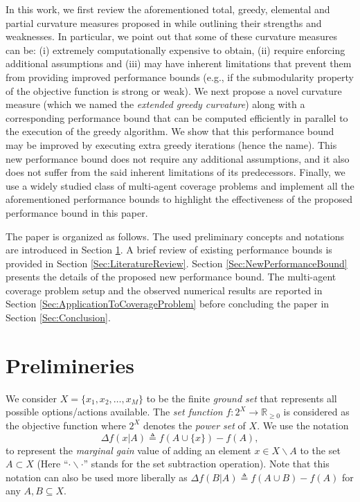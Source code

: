 \documentclass[conference]{IEEEtran}
\newcommand{\R}{\mathbb{R}}
\begin{document}
In this work, we first review the aforementioned total, greedy, elemental and partial curvature measures proposed in \cite{Conforti1984,Wang2016,Liu2018} while outlining their strengths and weaknesses. In particular, we point out that some of these curvature measures can be: (i) extremely computationally expensive to obtain, (ii) require enforcing additional assumptions and (iii) may have inherent limitations that prevent them from providing improved performance bounds (e.g., if the submodularity property of the objective function is strong or weak). We next propose a novel curvature measure (which we named the \emph{extended greedy curvature}) along with a corresponding performance bound that can be computed efficiently in parallel to the execution of the greedy algorithm. We show that this performance bound may be improved by executing extra greedy iterations (hence the name). This new performance bound does not require any additional assumptions, and it also does not suffer from the said inherent limitations of its predecessors. Finally, we use a widely studied class of multi-agent coverage problems \cite{Sun2019,Sun2020} and implement all the aforementioned performance bounds to highlight the effectiveness of the proposed performance bound in this paper.  







The paper is organized as follows. The used preliminary concepts and notations are introduced in Section \ref{Sec:PreliminariesAndNotation}. A brief review of existing performance bounds is provided in Section \ref{Sec:LiteratureReview}. Section \ref{Sec:NewPerformanceBound} presents the details of the proposed new performance bound. The multi-agent coverage problem setup and the observed numerical results are reported in Section \ref{Sec:ApplicationToCoverageProblem} before concluding the paper in Section \ref{Sec:Conclusion}. 











\section{Prelimineries}
\label{Sec:PreliminariesAndNotation}
We consider $X=\{x_1,x_2,\ldots,x_M\}$ to be the finite \emph{ground set} that represents all possible options/actions available. The \emph{set function} $f:2^X\rightarrow \R_{\geq0}$ is considered as the objective function where $2^X$ denotes the \emph{power set} of $X$. We use the notation 
\begin{equation}\label{Eq:MarginalGainNotation}
    \Delta f(x \vert A) \triangleq f(A\cup \{x\}) - f(A),
\end{equation}
to represent the \emph{marginal gain} value of adding an element $x \in X\backslash A$ to the set $A\subset X$ (Here ``$\cdot \backslash \cdot$'' stands for the set subtraction operation). Note that this notation can also be used more liberally as 
$\Delta f(B \vert A) \triangleq f(A\cup B)-f(A)$ for any $A,B\subseteq X$.
\end{document}
